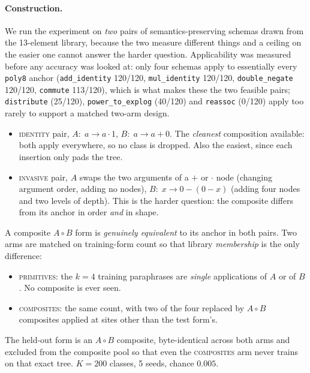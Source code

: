 \paragraph{Construction.} We run the experiment on \emph{two} pairs of semantics-preserving schemas drawn from the 13-element library, because the two measure different things and a ceiling on the easier one cannot answer the harder question. Applicability was measured before any accuracy was looked at: only four schemas apply to essentially every \texttt{poly8} anchor (\texttt{add\_identity} 120/120, \texttt{mul\_identity} 120/120, \texttt{double\_negate} 120/120, \texttt{commute} 113/120), which is what makes these the two feasible pairs; \texttt{distribute} (25/120), \texttt{power\_to\_explog} (40/120) and \texttt{reassoc} (0/120) apply too rarely to support a matched two-arm design.
\begin{itemize}[noitemsep,topsep=2pt,leftmargin=1.4em]
  \item \textsc{identity} pair, $A:\; a \to a \cdot 1$, \; $B:\; a \to a + 0$. The \emph{cleanest} composition available: both apply everywhere, so no class is dropped. Also the easiest, since each insertion only pads the tree.
  \item \textsc{invasive} pair, $A$ swaps the two arguments of a $+$ or $\cdot$ node (changing argument order, adding no nodes), \; $B:\; x \to 0-(0-x)$ (adding four nodes and two levels of depth). This is the harder question: the composite differs from its anchor in order \emph{and} in shape.
\end{itemize}
A composite $A\!\circ\!B$ form is \emph{genuinely equivalent} to its anchor in both pairs. Two arms are matched on training-form count so that library \emph{membership} is the only difference:
\begin{itemize}[noitemsep,topsep=2pt,leftmargin=1.4em]
  \item \textsc{primitives}: the $k{=}4$ training paraphrases are \emph{single} applications of $A$ or of $B$. No composite is ever seen.
  \item \textsc{composites}: the same count, with two of the four replaced by $A\!\circ\!B$ composites applied at sites other than the test form's.
\end{itemize}
The held-out form is an $A\!\circ\!B$ composite, byte-identical across both arms and excluded from the composite pool so that even the \textsc{composites} arm never trains on that exact tree. $K{=}200$ classes, 5 seeds, chance $0.005$.

